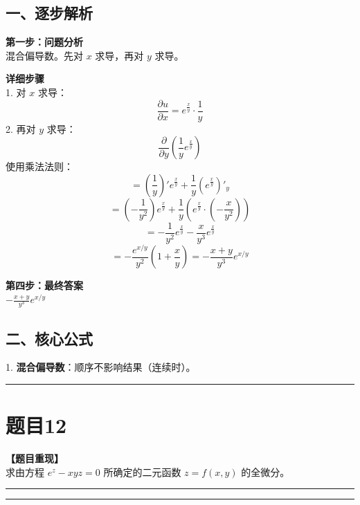 \documentclass[12pt, a4paper]{ctexart}
\newcommand{\TopSeparator}{
    \par\noindent\rule{\textwidth}{1.5pt}\vspace{0.5em} %
}
\newcommand{\AnalysisSeparator}{
    \par\noindent\rule{\textwidth}{0.5pt}\vspace{0.2em}\hrule\vspace{0.5em} %
}
\newenvironment{RedAnalysis}{
    \par
    \color{red} %
}{
    \par
    \color{black} %
}
\begin{document}
\begin{RedAnalysis}

\subsection*{一、逐步解析}

\textbf{第一步：问题分析} \\
混合偏导数。先对 $x$ 求导，再对 $y$ 求导。

\textbf{详细步骤} \\
1. 对 $x$ 求导：
   \[ \frac{\partial u}{\partial x} = e^{\frac{x}{y}} \cdot \frac{1}{y} \]
2. 再对 $y$ 求导：
   \[ \frac{\partial}{\partial y} (\frac{1}{y} e^{\frac{x}{y}}) \]
   使用乘法法则：
   \[ = (\frac{1}{y})' e^{\frac{x}{y}} + \frac{1}{y} (e^{\frac{x}{y}})'_y \]
   \[ = (-\frac{1}{y^2}) e^{\frac{x}{y}} + \frac{1}{y} (e^{\frac{x}{y}} \cdot (-\frac{x}{y^2})) \]
   \[ = -\frac{1}{y^2} e^{\frac{x}{y}} - \frac{x}{y^3} e^{\frac{x}{y}} \]
   \[ = - \frac{e^{x/y}}{y^2} (1 + \frac{x}{y}) = - \frac{x+y}{y^3} e^{x/y} \]

\textbf{第四步：最终答案} \\
$ - \frac{x+y}{y^3} e^{x/y} $

\subsection*{二、核心公式}
1. \textbf{混合偏导数}：顺序不影响结果（连续时）。

\end{RedAnalysis}

\vspace{2em}

\TopSeparator
\section*{题目12}

\textbf{【题目重现】} \\
求由方程 $ e^{z}-xyz=0 $ 所确定的二元函数 $ z=f(x,y) $ 的全微分。

\AnalysisSeparator
\end{document}
